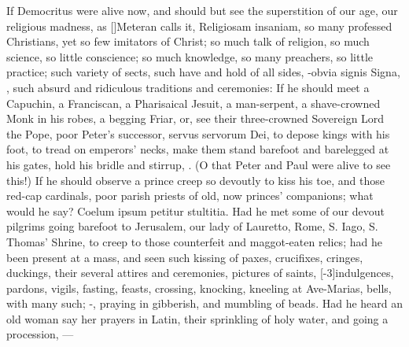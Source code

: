 {If Democritus were alive now, and should but see the superstition of
our age, our religious madness, as [\baselineskip]Meteran calls it,
Religiosam insaniam, so many professed Christians, yet so few imitators
of Christ; so much talk of religion, so much science, so little
conscience; so much knowledge, so many preachers, so little practice;
such variety of sects, such have and hold of all sides, -obvia
signis Signa, \etc{}, such absurd and ridiculous traditions and
ceremonies: If he should meet a  Capuchin, a Franciscan, a
Pharisaical Jesuit, a man-serpent, a shave-crowned Monk in his robes, a
begging Friar, or, see their three-crowned Sovereign Lord the Pope,
poor Peter's successor, servus servorum Dei, to depose kings with his
foot, to tread on emperors' necks, make them stand barefoot and
barelegged at his gates, hold his bridle and stirrup, \etc{}. (O that Peter
and Paul were alive to see this!) If he should observe a prince
creep so devoutly to kiss his toe, and those red-cap cardinals, poor
parish priests of old, now princes' companions; what would he say?
Coelum ipsum petitur stultitia. Had he met some of our devout pilgrims
going barefoot to Jerusalem, our lady of Lauretto, Rome, S. Iago, S.
Thomas' Shrine, to creep to those counterfeit and maggot-eaten relics;
had he been present at a mass, and seen such kissing of paxes,
crucifixes, cringes, duckings, their several attires and ceremonies,
pictures of saints, [-3\baselineskip]indulgences, pardons, vigils, fasting, feasts,
crossing, knocking, kneeling at Ave-Marias, bells, with many such;
-, praying in gibberish, and mumbling
of beads. Had he heard an old woman say her prayers in Latin, their
sprinkling of holy water, and going a procession,
---

}
